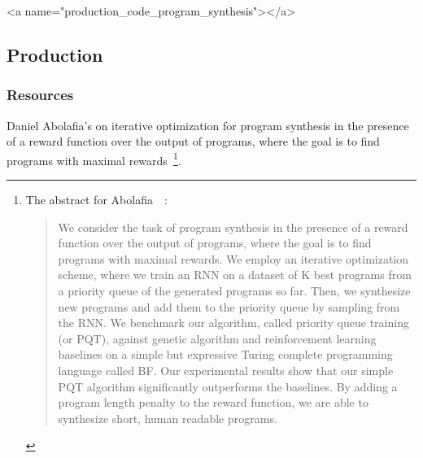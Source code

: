 
\rawhtml
<a name="production_code_program_synthesis"></a>
\endrawhtml
\subsection*{Production}


\subsubsection*{Resources}

Daniel Abolafia's {} on iterative optimization for program synthesis in the presence of a reward function over the output of programs, where the goal is to find programs with maximal rewards~\cite{AbolafiaetalCoRR-18}\footnote{%
%
  The abstract for Abolafia~\etal{}~\cite{AbolafiaetalCoRR-18}:
%
  \begin{quotation}
%
    We consider the task of program synthesis in the presence of a reward function over the output of programs, where the goal is to find programs with maximal rewards. We employ an iterative optimization scheme, where we train an RNN on a dataset of K best programs from a priority queue of the generated programs so far. Then, we synthesize new programs and add them to the priority queue by sampling from the RNN. We benchmark our algorithm, called priority queue training (or PQT), against genetic algorithm and reinforcement learning baselines on a simple but expressive Turing complete programming language called BF. Our experimental results show that our simple PQT algorithm significantly outperforms the baselines. By adding a program length penalty to the reward function, we are able to synthesize short, human readable programs.
%
  \end{quotation}}.

